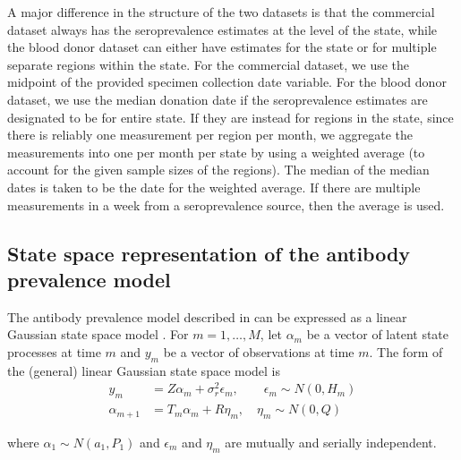 A major difference in the structure of the two datasets is that the commercial
dataset always has the seroprevalence estimates at the level of the state, while
the blood donor dataset can either have estimates for the state or for multiple
separate regions within the state. For the commercial dataset, we use the
midpoint of the provided specimen collection date variable.  For the blood donor
dataset, we use the median donation date if the seroprevalence estimates are
designated to be for entire state. If they are instead for regions in the state,
since there is reliably one measurement per region per month, we aggregate the
measurements into one per month per state by using a weighted average (to
account for the given sample sizes of the regions). The median of the median
dates is taken to be the date for the weighted average. If there are multiple
measurements in a week from a seroprevalence source, then the average is used.


\subsection{State space representation of the antibody prevalence
model}\label{supp:ssapm} 
\begin{linenomath*}
The antibody prevalence model described in  can be expressed
as a linear Gaussian state space model \citep{durbin2012time}.
For $m = 1, \dots, M$, let $\alpha_m$ be a vector of
latent state processes at time $m$ and $y_m$ be a vector of
observations at time $m$. The form of the (general) linear Gaussian state space model is 
\begin{align}
y_m &= Z\alpha_m + \sigma^2_r\epsilon_m, \qquad \epsilon_m \sim N(0, H_m) \label{eq:ss1}\\
\alpha_{m+1} &= T_m\alpha_m + R\eta_m, \quad \eta_m \sim N(0, Q) \label{eq:ss2}
\end{align}
\end{linenomath*}
where $\alpha_1 \sim N(a_1, P_1)$ and 
$\epsilon_m$ and $\eta_m$ are mutually and serially independent.


